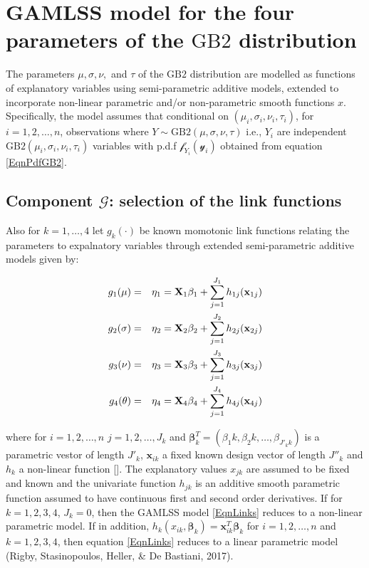 \documentclass{DissertateUSU}
\begin{document}
\section{GAMLSS model for the four parameters of the $\mbox{GB}2$ distribution}

The parameters \(\mu, \sigma,\nu,\) and \(\tau\) of the \(\mbox{GB}2\)
distribution are modelled as functions of explanatory variables using
semi-parametric additive models, extended to incorporate non-linear
parametric and/or non-parametric smooth functions \(x\). Specifically,
the model assumes that conditional on \((\mu_i,\sigma_i,\nu_i,\tau_i)\),
for \(i=1,2,\ldots,n\), observations where
\(Y \sim \mbox{GB}2(\mu,\sigma,\nu,\tau)\) i.e., \(Y_i\) are independent
\(\mbox{GB}2(\mu_i,\sigma_i,\nu_i,\tau_i)\) variables with p.d.f
\(\mathcal{f}_{Y_i}(\mathcal{y}_i)\) obtained from equation
\ref{EqnPdfGB2}.

\subsection{Component $\mathcal{G}$: selection of the link functions}

Also for \(k=1,\ldots,4\) let \(g_k(\cdot)\) be known momotonic link
functions relating the parameters to expalnatory variables through
extended semi-parametric additive models given by:

\singlespacing

\begin{eqnarray}\label{EqnLinks}
g_1(\mu) &=& \eta_1 = \mathbf{\Large{X}}_1\mathbf{\beta}_1 + \sum_{j=1}^{J_1}h_{1j}(\mathbf{x}_{1j})\nonumber\\
g_2(\sigma) &=& \eta_2 = \mathbf{\Large{X}}_2\mathbf{\beta}_2 + \sum_{j=1}^{J_2}h_{2j}(\mathbf{x}_{2j})\nonumber\\
g_3(\nu) &=& \eta_3 = \mathbf{\Large{X}}_3\mathbf{\beta}_3 + \sum_{j=1}^{J_3}h_{3j}(\mathbf{x}_{3j})\nonumber\\
g_4(\theta) &=& \eta_4 = \mathbf{\Large{X}}_4\mathbf{\beta}_4 + \sum_{j=1}^{J_4}h_{4j}(\mathbf{x}_{4j})
\end{eqnarray} \doublespacing

where for \(i=1,2,\ldots,n\) \(j=1,2,\ldots,J_k\) and
\(\mathbf{\beta}_k^T=(\beta_1k,\beta_2k,\ldots,\beta_{J'_kk})\) is a
parametric vestor of length \(J'_k\), \(\mathbf{x}_{ik}\) a fixed known
design vector of length \(J''_k\) and \(h_k\) a non-linear function
{[}{]}. The explanatory values \(x_{jk}\) are assumed to be fixed and
known and the univariate function \(h_{jk}\) is an additive smooth
parametric function assumed to have continuous first and second order
derivatives. If for \(k=1,2,3,4\), \(J_k=0\), then the GAMLSS model
\ref{EqnLinks} reduces to a non-linear parametric model. If in addition,
\(h_k(x_{ik},\mathbf{\beta}_k)=\mathbf{x}_{ik}^T\mathbf{\beta}_k\) for
\(i=1,2,\ldots,n\) and \(k=1,2,3,4\), then equation \ref{EqnLinks}
reduces to a linear parametric model (Rigby, Stasinopoulos, Heller, \&
De Bastiani, 2017).
\end{document}
